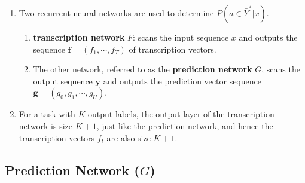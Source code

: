 \begin{enumerate}
    \item Two recurrent neural networks are used to determine $P(a \in \bar{Y}^\ast|x)$.
    \hfill \cite{arxiv/1211.3711/Sequence-Transduction-RNN}
    \begin{enumerate}
        \item \textbf{transcription network} $F$: scans the input sequence $x$ and outputs the sequence $\bm{f} = (f_1, \cdots , f_T )$ of transcription vectors.
        \hfill \cite{arxiv/1211.3711/Sequence-Transduction-RNN}

        \item The other network, referred to as the \textbf{prediction network} $G$, scans the output sequence $\bm{y}$ and outputs the prediction vector sequence $\bm{g} = (g_0, g_1, \cdots , g_U )$.
        \hfill \cite{arxiv/1211.3711/Sequence-Transduction-RNN}
    \end{enumerate}

    \item  For a task with $K$ output labels, the output layer of the transcription network is size $K + 1$, just like the prediction network, and hence the transcription vectors $f_t$ are also size $K + 1$.
    \hfill \cite{arxiv/1211.3711/Sequence-Transduction-RNN}
\end{enumerate}


\subsection{Prediction Network ($G$)}

